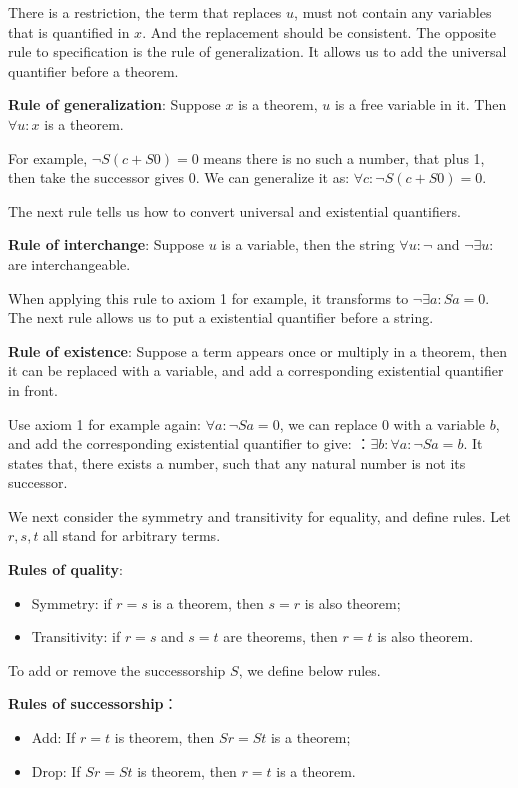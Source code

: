 \documentclass{article}
\begin{document}
There is a restriction, the term that replaces $u$, must not contain any variables that is quantified in $x$. And the replacement should be consistent. The opposite rule to specification is the rule of generalization. It allows us to add the universal quantifier before a theorem.

\textbf{Rule of generalization}: Suppose $x$ is a theorem, $u$ is a free variable in it. Then $\forall u: x$ is a theorem.

For example, $\lnot S(c + S0) = 0$ means there is no such a number, that plus 1, then take the successor gives 0. We can generalize it as: $\forall c: \lnot S(c + S0) = 0$.

The next rule tells us how to convert universal and existential quantifiers.

\textbf{Rule of interchange}: Suppose $u$ is a variable, then the string $\forall u: \lnot $ and $\lnot \exists u:$ are interchangeable.

When applying this rule to axiom 1 for example, it transforms to $\lnot \exists a: Sa = 0$. The next rule allows us to put a existential quantifier before a string.

\textbf{Rule of existence}: Suppose a term appears once or multiply in a theorem, then it can be replaced with a variable, and add a corresponding existential quantifier in front.

Use axiom 1 for example again: $\forall a: \lnot Sa = 0$, we can replace 0 with a variable $b$, and add the corresponding existential quantifier to give: ：$\exists b: \forall a: \lnot Sa = b$. It states that, there exists a number, such that any natural number is not its successor.

We next consider the symmetry and transitivity for equality, and define rules. Let $r, s, t$ all stand for arbitrary terms.

\textbf{Rules of quality}:
\begin{itemize}
\item Symmetry: if $r = s$ is a theorem, then $s = r$ is also theorem;
\item Transitivity: if $r = s$ and $s = t$ are theorems, then $r = t$ is also theorem.
\end{itemize}

To add or remove the successorship $S$, we define below rules.

\textbf{Rules of successorship}：
\begin{itemize}
\item Add: If $r = t$ is theorem, then $Sr = St$ is a theorem;
\item Drop: If $Sr = St$ is theorem, then $r = t$ is a theorem.
\end{itemize}
\end{document}
